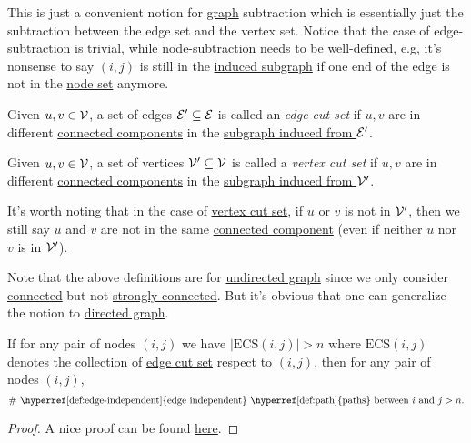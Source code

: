 \begin{intuition}
	This is just a convenient notion for \hyperref[def:graph]{graph} subtraction which is essentially just the subtraction between the edge set and the vertex set.
	Notice that the case of edge-subtraction is trivial, while node-subtraction needs to be well-defined, e.g, it's nonsense to say \((i, j)\) is still in the
	\hyperref[def:induced-subgraph]{induced subgraph} if one end of the edge is not in the \hyperref[def:vertex-set]{node set} anymore.
\end{intuition}

\begin{definition}\label{def:edge-cut-set}
	Given \(u, v\in \mathcal{\MakeUppercase{v}} \), a set of edges \(\mathcal{\MakeUppercase{e}} ^\prime \subseteq \mathcal{\MakeUppercase{e}} \) is called an \emph{edge cut set}
	if \(u, v\) are in different \hyperref[def:connected]{connected components} in the \hyperref[def:induced-subgraph]{subgraph induced from \(\mathcal{\MakeUppercase{e}} ^\prime \)}.
\end{definition}

\begin{definition}\label{def:vertex-cut-set}
	Given \(u, v\in \mathcal{\MakeUppercase{v}} \), a set of vertices \(\mathcal{\MakeUppercase{v}} ^\prime \subseteq \mathcal{\MakeUppercase{v}}\) is called a \emph{vertex cut set}
	if \(u, v\) are in different \hyperref[def:connected]{connected components} in the \hyperref[def:induced-subgraph]{subgraph induced from \(\mathcal{\MakeUppercase{v}} ^\prime \)}.
\end{definition}

\begin{note}
	It's worth noting that in the case of \hyperref[def:vertex-cut-set]{vertex cut set}, if \(u\) or \(v\) is not in \(\mathcal{\MakeUppercase{v}} ^\prime\), then we still say
	\(u\) and \(v\) are not in the same \hyperref[def:connected]{connected component} (even if neither \(u\) nor \(v\) is in \(\mathcal{\MakeUppercase{v}} ^\prime \)).
\end{note}

\begin{remark}
	Note that the above definitions are for \hyperref[def:undirected-graph]{undirected graph} since we only consider \hyperref[def:connected]{connected} but not \hyperref[def:strongly-connected]{strongly connected}.
	But it's obvious that one can generalize the notion to \hyperref[def:directed-graph]{directed graph}.
\end{remark}


\begin{theorem}\label{thm:Mengur-theorem}
	If for any pair of nodes \((i, j)\) we have \(\left\vert \mathrm{ECS}(i, j) \right\vert > n\) where \(\mathrm{ECS} (i, j)\) denotes the collection of \hyperref[def:edge-cut-set]{edge cut set}
	respect to \((i, j)\), then for any pair of nodes \((i, j)\),
	\[
		\# \text{ \hyperref[def:edge-independent]{edge independent} \hyperref[def:path]{paths} between } i \text{ and } j > n.
	\]
\end{theorem}
\begin{proof}
	A nice proof can be found \href{https://en.wikipedia.org/wiki/Menger%27s_theorem}{here}.
\end{proof}